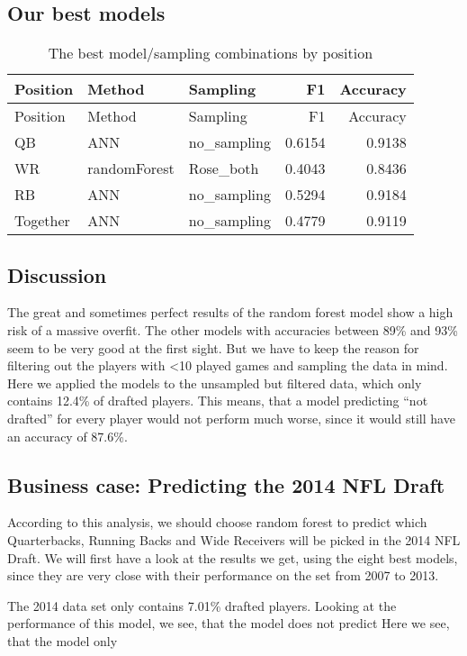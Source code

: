\documentclass[]{article}
\begin{document}
\hypertarget{our-best-models}{%
\subsection{Our best models}\label{our-best-models}}

\begin{longtable}[]{@{}lllrr@{}}
\caption{The best model/sampling combinations by
position}\tabularnewline
\toprule
Position & Method & Sampling & F1 & Accuracy\tabularnewline
\midrule
\endfirsthead
\toprule
Position & Method & Sampling & F1 & Accuracy\tabularnewline
\midrule
\endhead
QB & ANN & no\_sampling & 0.6154 & 0.9138\tabularnewline
WR & randomForest & Rose\_both & 0.4043 & 0.8436\tabularnewline
RB & ANN & no\_sampling & 0.5294 & 0.9184\tabularnewline
Together & ANN & no\_sampling & 0.4779 & 0.9119\tabularnewline
\bottomrule
\end{longtable}

\hypertarget{discussion}{%
\subsection{Discussion}\label{discussion}}

The great and sometimes perfect results of the random forest model show
a high risk of a massive overfit. The other models with accuracies
between 89\% and 93\% seem to be very good at the first sight. But we
have to keep the reason for filtering out the players with \textless10
played games and sampling the data in mind. Here we applied the models
to the unsampled but filtered data, which only contains 12.4\% of
drafted players. This means, that a model predicting ``not drafted'' for
every player would not perform much worse, since it would still have an
accuracy of 87.6\%.

\hypertarget{business-case-predicting-the-2014-nfl-draft}{%
\subsection{Business case: Predicting the 2014 NFL
Draft}\label{business-case-predicting-the-2014-nfl-draft}}

According to this analysis, we should choose random forest to predict
which Quarterbacks, Running Backs and Wide Receivers will be picked in
the 2014 NFL Draft. We will first have a look at the results we get,
using the eight best models, since they are very close with their
performance on the set from 2007 to 2013.

The 2014 data set only contains 7.01\% drafted players. Looking at the
performance of this model, we see, that the model does not predict Here
we see, that the model only
\end{document}
